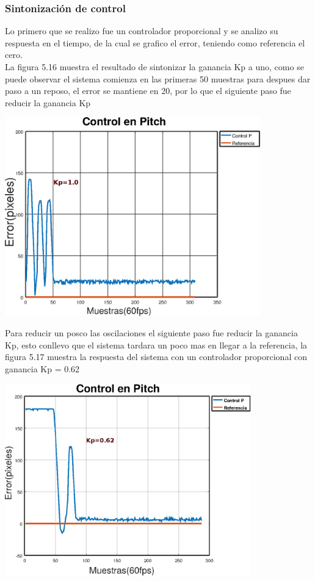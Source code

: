 \subsubsection{Sintonización de control}
Lo primero que se realizo fue un controlador proporcional y se analizo su respuesta en el tiempo, de la cual se grafico el error, teniendo 
como referencia el cero.\\
La figura 5.16 muestra el resultado de sintonizar la ganancia Kp a uno, como se puede observar el sistema comienza en las primeras 50 muestras
para despues dar paso a un reposo, el error se mantiene en 20, por lo que el siguiente paso fue reducir la ganancia Kp
\begin{center}
	\includegraphics[width=0.83\textwidth]{Contenido/Cuerpo/Capitulo5/Fig25.eps}
	\label{Fig4}
\end{center}
Para reducir un posco las oscilaciones el siguiente paso fue reducir la ganancia Kp, esto conllevo que el sistema tardara un poco mas en 
llegar a la referencia, la figura 5.17 muestra la respuesta del sistema con un controlador proporcional con ganancia Kp = 0.62
\begin{center}
	\includegraphics[width=0.8\textwidth]{Contenido/Cuerpo/Capitulo5/Fig26.eps}
	\label{Fig4}
\end{center}
